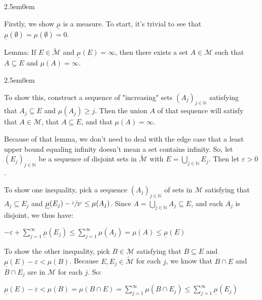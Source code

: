 \documentclass{book}
\newcommand{\exTwoP}{%
   \color{RedViolet}%
   \fontsize{13}{15}\selectfont%
}
\newcommand{\exPPP}{%
   \color{VioletRed}%
   \fontsize{12}{14}\selectfont%
}
\newenvironment{myIndent}{%
   \begin{adjustwidth}{2.5em}{0em}%
}{%
   \end{adjustwidth}%
}
\newcommand{\retTwo}{\hfill\bigbreak}
\begin{document}
\begin{enumerate}
   \begin{myIndent}\exTwoP
      Firstly, we show $\underline{\mu}$ is a measure. To start, it's trivial to see that $\underline{\mu}(\emptyset) = \mu(\emptyset) = 0$.\retTwo

      Lemma: If $E \in \widetilde{\mathcal{M}}$ and $\underline{\mu}(E) = \infty$, then there exists a set $A \in \mathcal{M}$ such that $A \subseteq E$ and $\mu(A) = \infty$. 
      \begin{myIndent}\exPPP
         To show this, construct a sequence of "increasing" sets $(A_j)_{j \in \mathbb{N}}$ satisfying\\ that $A_j \subseteq E$ and $\mu(A_j) \geq j$. Then the union $A$ of that sequence will satisfy\\ that $A \in \mathcal{M}$, that $A \subseteq E$, and that $\mu(A) = \infty$.\retTwo
      \end{myIndent}

      Because of that lemma, we don't need to deal with the edge case that a least upper bound equaling infinity doesn't mean a set contains infinity. So, let $(E_j)_{j \in \mathbb{N}}$ be a sequence of disjoint sets in $\widetilde{\mathcal{M}}$ with $E = \bigcup\limits_{j \in \mathbb{N}} E_j$. Then let $\varepsilon > 0$.\retTwo

      To show one inequality, pick a sequence $(A_j)_{j \in \mathbb{N}}$ of sets in $\mathcal{M}$ satisfying that $A_j \subseteq E_j$ and $\underline{\mu}(E_j) - \sfrac{\varepsilon}{2^j} \leq \mu(A_j)$. Since $A = \bigcup\limits_{j \in \mathbb{N}}A_j \subseteq E$, and each $A_j$ is\\ [-10pt] disjoint, we thus have:

      {\centering $-\varepsilon + \sum\limits_{j=1}^\infty \underline{\mu}(E_j) \leq \sum\limits_{j=1}^\infty \mu(A_j) = \mu(A) \leq \underline{\mu}(E)$ \newpage\par}

      To show the other inequality, pick $B \in \mathcal{M}$ satisfying that $B \subseteq E$ and\\ [1pt] $\underline{\mu}(E) - \varepsilon < \mu(B)$. Because $E, E_j \in \widetilde{\mathcal{M}}$ for each $j$, we know that $B \cap E$ and\\ [3pt] $B \cap E_j$ are in $\mathcal{M}$ for each $j$. So:

      {\centering $\underline{\mu}(E) - \varepsilon < \mu(B) = \mu(B \cap E) = \sum\limits_{j=1}^\infty \mu(B \cap E_j) \leq \sum\limits_{j=1}^\infty\underline{\mu}(E_j)$\\ [1pt]\par}


\end{myIndent}
\end{enumerate}
\end{document}
